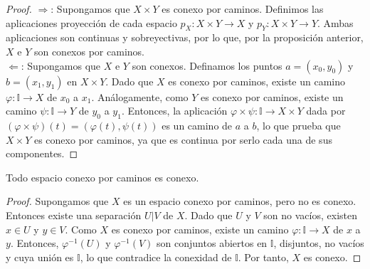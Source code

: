 \begin{proof}
    $\Rightarrow$: Supongamos que $X \times Y$ es conexo por caminos. Definimos las aplicaciones proyección de cada espacio $p_X: X \times Y \to X$ y $p_Y: X \times Y \to Y$. Ambas aplicaciones son continuas y sobreyectivas, por lo que, por la proposición anterior, $X$ e $Y$ son conexos por caminos.\\
    $\Leftarrow$: Supongamos que $X$ e $Y$ son conexos. Definamos los puntos $a = (x_0, y_0)$ y $b = (x_1, y_1)$ en $X \times Y$. Dado que $X$ es conexo por caminos, existe un camino $\varphi \colon \mathbb{I} \to X$ de $x_0$ a $x_1$. Análogamente, como $Y$ es conexo por caminos, existe un camino $\psi \colon \mathbb{I} \to Y$ de $y_0$ a $y_1$. Entonces, la aplicación $\varphi \times \psi \colon \mathbb{I} \to X \times Y$ dada por $(\varphi \times \psi)(t) = (\varphi(t), \psi(t))$ es un camino de $a$ a $b$, lo que prueba que $X \times Y$ es conexo por caminos, ya que es continua por serlo cada una de sus componentes. 
\end{proof}
\begin{proposición}
    Todo espacio conexo por caminos es conexo.
\end{proposición}
\begin{proof}
    Supongamos que $X$ es un espacio conexo por caminos, pero no es conexo. Entonces existe una separación $U|V$ de $X$. Dado que $U$ y $V$ son no vacíos, existen $x \in U$ y $y \in V$. Como $X$ es conexo por caminos, existe un camino $\varphi \colon \mathbb{I} \to X$ de $x$ a $y$. Entonces, $\varphi^{-1}(U)$ y $\varphi^{-1}(V)$ son conjuntos abiertos en $\mathbb{I}$, disjuntos, no vacíos y cuya unión es $\mathbb{I}$, lo que contradice la conexidad de $\mathbb{I}$. Por tanto, $X$ es conexo.
\end{proof}
